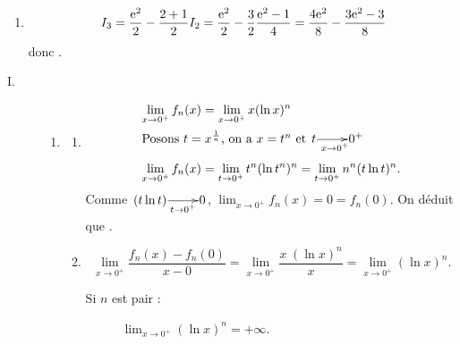 \begin{description}
\begin{enumerate}
\begin{enumerate}
							Posons $u	= (\ln x)^{n+1}$ et $v'	= x $, on a $u'	= (n+1) \frac{1}{x} (\ln x)^n$ et $v	= \frac{x^2}{2}$.
							\begin{align*}
								I_{n+1}	& = \left[\frac{x^2}{2}(\ln x)^{n+1}\right]_{1}^{e}-\frac{n+1}{2}\int_{1}^{e}x(\ln x)^n\dx	
							\end{align*}
							Donc .
						\item {}
							\[
								I_3		= \frac{\mathrm{e}^{2}}{2} - \frac{2 + 1}{2} I_2 
										= \frac{\mathrm{e}^{2}}{2} - \frac{3}{2} \frac{\mathrm{e}^{2} - 1}{4}
										= \frac{4 \mathrm{e}^{2}}{8} - \frac{3 \mathrm{e}^{2} - 3}{8}
							\]
							donc .
					\end{enumerate}
			\end{enumerate}
		\item[Partie B]
			\begin{description}
				\item[I. ]
					\begin{enumerate}
						\item \begin{enumerate}
									\item {}
										\begin{align*}
											\lim_{x\rightarrow 0^+} f_n (x) 
												& = \lim_{x\rightarrow 0^+} x (\ln x)^n 	\\
										\intertext{Posons $t = x^{\frac{1}{n}}$, on a $x = t^n$ et
												 $\xymatrix@1{ t\ar[r]_{x\rightarrow 0^+} & 0^+}$}
											\lim_{x\rightarrow 0^+} f_n (x) 
												& = \lim_{t\rightarrow 0^+} t^n (\ln t^n)^n
											  = \lim_{t\rightarrow 0^+} n^n (t \ln t)^n 			.
										\end{align*}
										Comme $\xymatrix@1{ (t \ln t) \ar[r]_-{t\rightarrow 0^+} & 0}$,
										$\displaystyle{\lim_{x\rightarrow 0^+} f_n (x) = 0 = f_n (0)}$.
										On d\'eduit que .
									\item {}
										\[
											\lim_{x\rightarrow 0^+} \frac{f_n (x) - f_n (0)}{x - 0}			
												= \lim_{x\rightarrow 0^+} \frac{x \; (\ln x)^n}{x}			
												= \lim_{x\rightarrow 0^+} (\ln x)^n .
										\]
										\begin{description}
											\item[Si $n$ est pair :] $ \lim_{x\rightarrow 0^+} (\ln x)^n = +\infty$.

\end{description}
\end{enumerate}
\end{enumerate}
\end{description}
\end{description}
